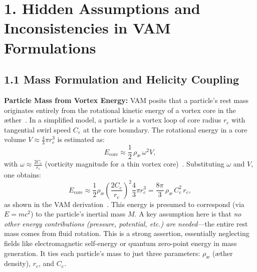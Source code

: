 \documentclass[a4paper,12pt]{article}
\begin{document}
\section*{1. Hidden Assumptions and Inconsistencies in VAM Formulations}

\subsection*{1.1 Mass Formulation and Helicity Coupling}

    \textbf{Particle Mass from Vortex Energy:} VAM posits that a particle’s rest mass originates entirely from the rotational kinetic energy of a vortex core in the æther~\cite{vamcore}. In a simplified model, a particle is a vortex loop of core radius $r_c$ with tangential swirl speed $C_e$ at the core boundary. The rotational energy in a core volume $V \approx \tfrac{4}{3}\pi r_c^3$ is estimated as:
    \begin{equation}
        E_{\text{core}} \approx \frac{1}{2}\,\rho_{\text{\ae}}\,\omega^2 V,
    \end{equation}
    with $\omega \approx \frac{2C_e}{r_c}$ (vorticity magnitude for a thin vortex core)~\cite{vamcore}. Substituting $\omega$ and $V$, one obtains:
    \begin{equation}
        E_{\text{core}} \approx \frac{1}{2}\rho_{\text{\ae}}\left(\frac{2C_e}{r_c}\right)^2 \frac{4}{3}\pi r_c^3 = \frac{8\pi}{3}\,\rho_{\text{\ae}}\,C_e^2\,r_c,
    \end{equation}
    as shown in the VAM derivation~\cite{vamcore}. This energy is presumed to correspond (via $E=mc^2$) to the particle’s inertial mass $M$. A key assumption here is that \emph{no other energy contributions (pressure, potential, etc.) are needed}---the entire rest mass comes from fluid rotation. This is a strong assertion, essentially neglecting fields like electromagnetic self-energy or quantum zero-point energy in mass generation. It ties each particle’s mass to just three parameters: $\rho_{\text{\ae}}$ (æther density), $r_c$, and $C_e$.
\end{document}
